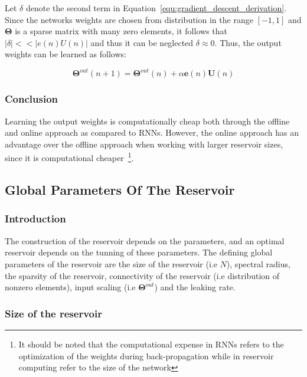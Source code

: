 \documentclass{WitsPhysicsReport}
\begin{document}
Let $\delta$ denote the second term in Equation~\ref{equ:gradient_descent_derivation}. Since the networks weights are chosen from distribution in the range $[-1,1]$ and $\mathbf{\Theta}$ is a sparse matrix with many zero elements, it follows that $|\delta |<< |e(n)U(n)|$ and thus it can be neglected $\delta \approx 0$. Thus, the output weights can be learned as follows:


\begin{equation}
    \mathbf{\Theta}^{out}(n+1) = \mathbf{\Theta}^{out}(n) + \alpha  \mathbf{e}(n) \mathbf{U}(n)
     \label{equ:gradient_descent_final}
\end{equation}

\subsubsection{Conclusion}
Learning the output weights is computationally cheap both through the offline and online approach as compared to RNNs. However, the online approach has an advantage over the offline approach when working with larger reservoir sizes, since it is computational cheaper~\footnote{It should be noted that the computational expense in RNNs refers to the optimization of the weights during back-propagation while in reservoir computing refer to the size of the network}.

\newpage
\subsection{Global Parameters Of The Reservoir}
\label{sec:Global_parameters_of_the_reservoir}
\subsubsection{Introduction}

The construction of the reservoir depends on the parameters, and an optimal reservoir depends on the tunning of these parameters. The defining global parameters of the reservoir are the size of the reservoir (i.e $N$), spectral radius, the sparsity of the reservoir,  connectivity of the reservoir (i.e distribution of nonzero elements), input scaling (i.e $\mathbf{\Theta}^{out}$) and the leaking rate.



\subsubsection{Size of the reservoir}
\label{sec: size_of_the_reservoir}
\end{document}
